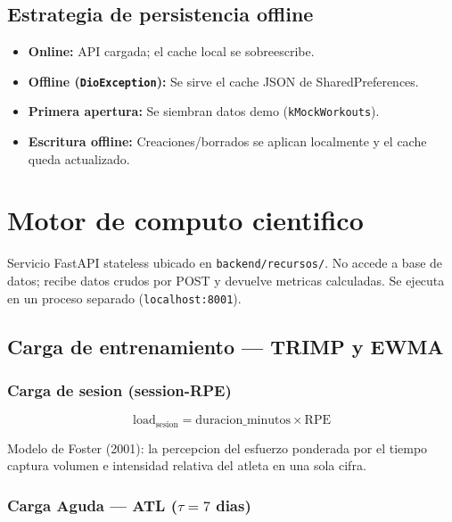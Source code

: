 \documentclass[12pt, a4paper]{article}
\begin{document}
\subsection{Estrategia de persistencia offline}

\begin{itemize}
  \item \textbf{Online:} API cargada; el cache local se sobreescribe.
  \item \textbf{Offline (\texttt{DioException}):} Se sirve el cache JSON de SharedPreferences.
  \item \textbf{Primera apertura:} Se siembran datos demo (\texttt{kMockWorkouts}).
  \item \textbf{Escritura offline:} Creaciones/borrados se aplican localmente
        y el cache queda actualizado.
\end{itemize}

\section{Motor de computo cientifico}

Servicio FastAPI stateless ubicado en \texttt{backend/recursos/}.
No accede a base de datos; recibe datos crudos por POST y devuelve metricas calculadas.
Se ejecuta en un proceso separado (\texttt{localhost:8001}).

\subsection{Carga de entrenamiento --- TRIMP y EWMA}

\subsubsection{Carga de sesion (session-RPE)}

\[
  \text{load}_{\text{sesion}} = \text{duracion\_minutos} \times \text{RPE}
\]

Modelo de Foster (2001): la percepcion del esfuerzo ponderada por el tiempo
captura volumen e intensidad relativa del atleta en una sola cifra.

\subsubsection{Carga Aguda --- ATL ($\tau = 7$ dias)}
\end{document}
